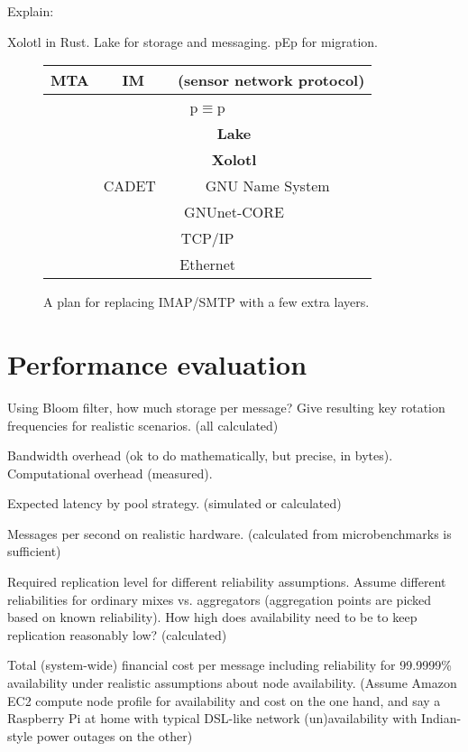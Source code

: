 \documentclass[twoside,letterpaper]{llncs}
\begin{document}
Explain:

Xolotl in Rust.
Lake for storage and messaging.
pEp for migration.

\begin{figure}
\begin{center}
\begin{tabular}{|c|c|c|} \hline
   MTA & IM & (sensor network protocol) \\ \hline
   \multicolumn{3}{|c|}{{p$\equiv$p}}  \\ \hline
   & \multicolumn{2}{|c|}{{\bf Lake}}   \\ \cline{2-3}
   & \multicolumn{2}{|c|}{{\bf Xolotl}} \\ \cline{2-3}
   \raisebox{1.5ex}{SMTP} & CADET~\cite{cadet} & GNU Name System~\cite{gns}  \\ \cline{2-3}
   & \multicolumn{2}{|c|}{GNUnet-CORE}  \\ \hline
   \multicolumn{3}{|c|}{TCP/IP}       \\ \hline
   \multicolumn{3}{|c|}{Ethernet}     \\ \hline
\end{tabular}
\end{center}
\caption{A plan for replacing IMAP/SMTP with a few extra layers.}
\label{fig:layers}
\end{figure}


\section{Performance evaluation}

Using Bloom filter, how much storage per message?
Give resulting key rotation frequencies for realistic
scenarios. (all calculated)

Bandwidth overhead (ok to do mathematically, but precise,
in bytes).  Computational overhead (measured).

Expected latency by pool strategy. (simulated or calculated)

Messages per second on realistic hardware. (calculated from
microbenchmarks is sufficient)

Required replication level for different reliability assumptions.
Assume different reliabilities for ordinary mixes vs. aggregators
(aggregation points are picked based on known reliability).  How high
does availability need to be to keep replication reasonably low?
(calculated)

Total (system-wide) financial cost per message including reliability
for 99.9999\% availability under realistic assumptions about node
availability. (Assume Amazon EC2 compute node profile for availability
and cost on the one hand, and say a Raspberry Pi at home with typical
DSL-like network (un)availability with Indian-style power outages on
the other)
\end{document}
